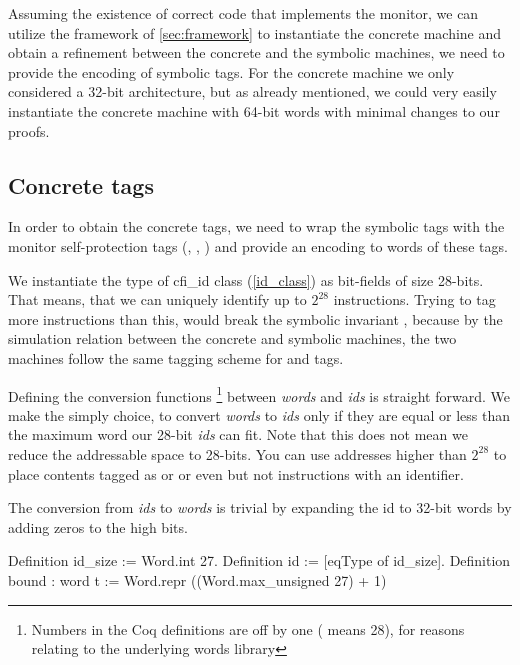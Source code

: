 Assuming the existence of correct code that implements the \CFI
monitor, we can utilize the framework of \cref{sec:framework} to
instantiate the concrete machine and obtain a refinement between the
concrete and the symbolic machines, we need to provide the encoding of
symbolic tags. For the concrete machine we only considered a 32-bit
architecture, but as already mentioned, we could very easily
instantiate the concrete machine with 64-bit words with minimal
changes to our proofs.

\subsection{Concrete tags}\label{sec:concrete_tags}

In order to obtain the concrete tags, we need to wrap the symbolic
tags with the monitor self-protection tags (\USERname, \ENTRYname,
\MONITOR) and provide an encoding to words of these tags.

We instantiate the \id type of cfi\_id class (\cref{id_class}) as
bit-fields of size 28-bits. That means, that we can uniquely identify
up to $2^{28}$ instructions. Trying to tag more instructions than
this, would break the symbolic
invariant , because by the simulation
relation between the concrete and symbolic machines, the
two machines follow the same tagging scheme for \USERname and \ENTRYname tags.

Defining the conversion functions \footnote{Numbers in the Coq
  definitions are off by one ( means 28), for reasons relating
  to the underlying words library } between
\textit{words} and \textit{ids} is straight forward. We make the
simply choice, to convert \textit{words} to \textit{ids} only if they
are equal or less than the maximum word our 28-bit \textit{ids} can
fit. Note that this does not mean we reduce the addressable space to
28-bits. You can use addresses higher than $2^{28}$ to place contents
tagged as \DATAname or \MONITOR or even \INSTR{$\bot$} but not
instructions with an identifier.

The conversion from \textit{ids} to \textit{words} is trivial by
expanding the id to 32-bit words by adding zeros to the high bits.


Definition id_size := Word.int 27.
Definition id := [eqType of id_size].
Definition bound : word t :=
  Word.repr ((Word.max_unsigned 27) + 1)%

